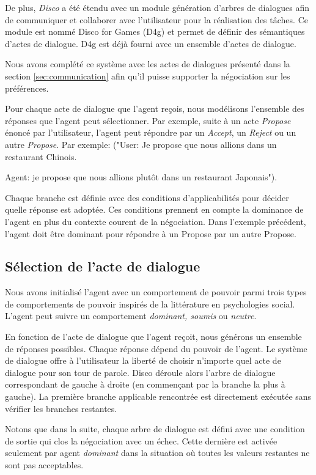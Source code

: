 	De plus, \emph{Disco} a été étendu avec un module génération d'arbres de dialogues afin de communiquer et collaborer avec l'utilisateur pour la réalisation des tâches. Ce module est nommé Disco for Games (D4g) et permet de définir des sémantiques d'actes de dialogue. D4g est déjà fourni avec un ensemble d'actes de dialogue.
	
	Nous avons complété ce système avec les actes de dialogues présenté dans la section \ref{sec:communication} afin qu'il puisse supporter la négociation sur les préférences.
	
	Pour chaque acte de dialogue que l'agent reçois, nous modélisons l'ensemble des réponses que l'agent peut sélectionner. Par exemple, suite à un acte \emph{Propose} énoncé par l'utilisateur, l'agent peut répondre par un \emph{Accept}, un \emph{Reject} ou un autre \emph{Propose}. Par exemple:
	("User: Je propose que nous allions dans un restaurant Chinois. 
	
	Agent: je propose que nous allions plutôt dans un restaurant Japonais"). 
	
	Chaque branche est définie avec des conditions d'applicabilités pour décider quelle réponse est adoptée. 
	Ces conditions prennent en compte la dominance de l'agent en plus du contexte courent de la négociation. Dans l'exemple précédent, l'agent doit être dominant pour répondre à un Propose par un autre Propose. 
	
	
	\subsection{Sélection de l'acte de dialogue}
	Nous avons initialisé l'agent avec un comportement de pouvoir parmi trois types de comportements de pouvoir inspirés de la littérature en psychologies social.  L'agent peut suivre un comportement \emph{dominant, soumis} ou \emph{neutre}. 
	
	En fonction de l'acte de dialogue que l'agent reçoit, nous générons un ensemble de réponses possibles. Chaque réponse dépend du pouvoir de l'agent. Le système de dialogue offre à l'utilisateur la liberté de choisir n'importe quel acte de dialogue pour son tour de parole. Disco déroule alors l'arbre de dialogue correspondant de gauche à droite (en commençant par la branche la plus à gauche). La première branche applicable rencontrée est directement exécutée sans vérifier les branches restantes.
	
	Notons que dans la suite, chaque arbre de dialogue est défini avec une condition de sortie qui clos la négociation avec un échec. Cette dernière est activée seulement par agent \emph{dominant} dans la situation où toutes les valeurs restantes ne sont pas acceptables. 
	

